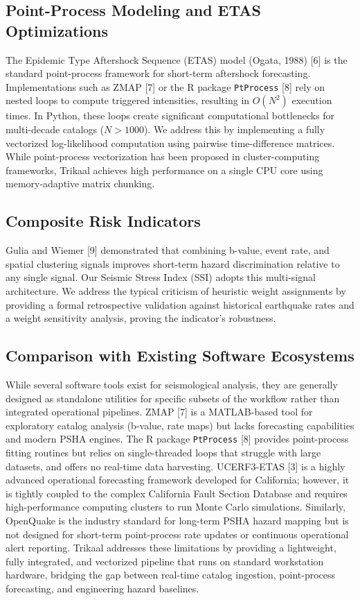 \documentclass[journal]{IEEEtran}
\begin{document}
\subsection{Point-Process Modeling and ETAS Optimizations}
The Epidemic Type Aftershock Sequence (ETAS) model (Ogata, 1988) [6] is the standard point-process framework for short-term aftershock forecasting. Implementations such as ZMAP [7] or the R package \texttt{PtProcess} [8] rely on nested loops to compute triggered intensities, resulting in $O(N^2)$ execution times. In Python, these loops create significant computational bottlenecks for multi-decade catalogs ($N > 1000$). We address this by implementing a fully vectorized log-likelihood computation using pairwise time-difference matrices. While point-process vectorization has been proposed in cluster-computing frameworks, Trikaal achieves high performance on a single CPU core using memory-adaptive matrix chunking.

\subsection{Composite Risk Indicators}
Gulia and Wiemer [9] demonstrated that combining b-value, event rate, and spatial clustering signals improves short-term hazard discrimination relative to any single signal. Our Seismic Stress Index (SSI) adopts this multi-signal architecture. We address the typical criticism of heuristic weight assignments by providing a formal retrospective validation against historical earthquake rates and a weight sensitivity analysis, proving the indicator's robustness.

\subsection{Comparison with Existing Software Ecosystems}
While several software tools exist for seismological analysis, they are generally designed as standalone utilities for specific subsets of the workflow rather than integrated operational pipelines. ZMAP [7] is a MATLAB-based tool for exploratory catalog analysis (b-value, rate maps) but lacks forecasting capabilities and modern PSHA engines. The R package \texttt{PtProcess} [8] provides point-process fitting routines but relies on single-threaded loops that struggle with large datasets, and offers no real-time data harvesting. UCERF3-ETAS [3] is a highly advanced operational forecasting framework developed for California; however, it is tightly coupled to the complex California Fault Section Database and requires high-performance computing clusters to run Monte Carlo simulations. Similarly, OpenQuake is the industry standard for long-term PSHA hazard mapping but is not designed for short-term point-process rate updates or continuous operational alert reporting. Trikaal addresses these limitations by providing a lightweight, fully integrated, and vectorized pipeline that runs on standard workstation hardware, bridging the gap between real-time catalog ingestion, point-process forecasting, and engineering hazard baselines.
\end{document}
